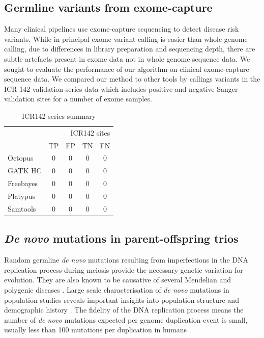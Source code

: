 \documentclass[notitlepage, twocolumn]{article}
\begin{document}
\subsection*{Germline variants from exome-capture}

Many clinical pipelines use exome-capture sequencing to detect disease risk variants. While in principal exome variant calling is easier than whole genome calling, due to differences in library preparation and sequencing depth, there are subtle artefacts present in exome data not in whole genome sequence data. We sought to evaluate the performance of our algorithm on clinical exome-capture sequence data. We compared our method to other tools by callings variants in the ICR 142 validation series data \cite{RN154} which includes positive and negative Sanger validation sites for a number of exome samples.

\begin{table}[ht]
\centering
\caption{ICR142 series summary}
\begin{tabular}{lcccc}
\hline
\multicolumn{5}{r}{ICR142 sites} \\
\cline{2-5} & TP & FP & TN & FN \\
\hline
Octopus & 0 & 0 & 0 & 0 \\
GATK HC & 0 & 0 & 0 & 0 \\
Freebayes & 0 & 0 & 0 & 0 \\
Platypus & 0 & 0 & 0 & 0 \\
Samtools & 0 & 0 & 0 & 0 \\
\hline
\end{tabular}
\end{table}

\subsection*{\textit{De novo} mutations in parent-offspring trios}

Random germline \textit{de novo} mutations resulting from imperfections in the DNA replication process during meiosis provide the necessary genetic variation for evolution. They are also known to be causative of several Mendelian and polygenic diseases \cite{RN157, RN160, RN159}. Large scale characterisation of \textit{de novo} mutations in population studies reveals important insights into population structure and demographic history \cite{RN158}. The fidelity of the DNA replication process means the number of \textit{de novo} mutations expected per genome duplication event is small, usually less than 100 mutations per duplication in humans \cite{RN6}.
\end{document}
